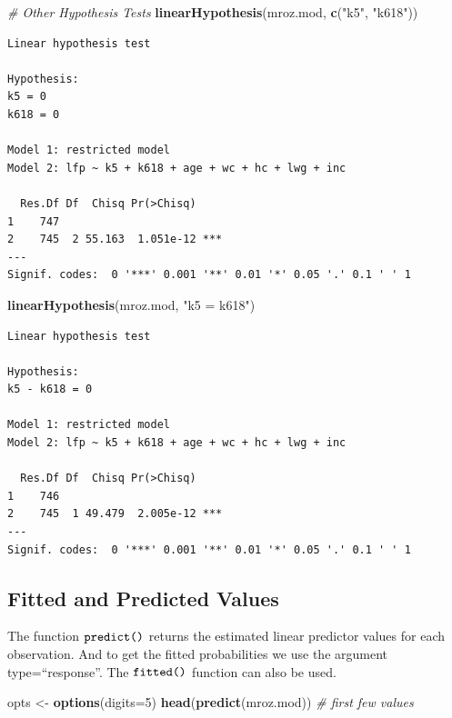 \documentclass[
]{article}
\newenvironment{Shaded}{\begin{snugshade}}{\end{snugshade}}
\newcommand{\CommentTok}[1]{\textcolor[rgb]{0.56,0.35,0.01}{\textit{#1}}}
\newcommand{\DataTypeTok}[1]{\textcolor[rgb]{0.13,0.29,0.53}{#1}}
\newcommand{\DecValTok}[1]{\textcolor[rgb]{0.00,0.00,0.81}{#1}}
\newcommand{\KeywordTok}[1]{\textcolor[rgb]{0.13,0.29,0.53}{\textbf{#1}}}
\newcommand{\NormalTok}[1]{#1}
\newcommand{\StringTok}[1]{\textcolor[rgb]{0.31,0.60,0.02}{#1}}
\begin{document}
\begin{Shaded}
\begin{Highlighting}[]
\CommentTok{# Other Hypothesis Tests}
\KeywordTok{linearHypothesis}\NormalTok{(mroz.mod, }\KeywordTok{c}\NormalTok{(}\StringTok{"k5"}\NormalTok{, }\StringTok{"k618"}\NormalTok{))}
\end{Highlighting}
\end{Shaded}

\begin{verbatim}
Linear hypothesis test

Hypothesis:
k5 = 0
k618 = 0

Model 1: restricted model
Model 2: lfp ~ k5 + k618 + age + wc + hc + lwg + inc

  Res.Df Df  Chisq Pr(>Chisq)    
1    747                         
2    745  2 55.163  1.051e-12 ***
---
Signif. codes:  0 '***' 0.001 '**' 0.01 '*' 0.05 '.' 0.1 ' ' 1
\end{verbatim}

\begin{Shaded}
\begin{Highlighting}[]
\KeywordTok{linearHypothesis}\NormalTok{(mroz.mod, }\StringTok{"k5 = k618"}\NormalTok{)}
\end{Highlighting}
\end{Shaded}

\begin{verbatim}
Linear hypothesis test

Hypothesis:
k5 - k618 = 0

Model 1: restricted model
Model 2: lfp ~ k5 + k618 + age + wc + hc + lwg + inc

  Res.Df Df  Chisq Pr(>Chisq)    
1    746                         
2    745  1 49.479  2.005e-12 ***
---
Signif. codes:  0 '***' 0.001 '**' 0.01 '*' 0.05 '.' 0.1 ' ' 1
\end{verbatim}

\hypertarget{fitted-and-predicted-values}{%
\subsection{Fitted and Predicted
Values}\label{fitted-and-predicted-values}}

The function \(\verb+predict()+\) returns the estimated linear predictor
values for each observation. And to get the fitted probabilities we use
the argument type=``response''. The \(\verb+fitted()+\) function can
also be used.

\begin{Shaded}
\begin{Highlighting}[]
\NormalTok{opts <-}\StringTok{ }\KeywordTok{options}\NormalTok{(}\DataTypeTok{digits=}\DecValTok{5}\NormalTok{)}
\KeywordTok{head}\NormalTok{(}\KeywordTok{predict}\NormalTok{(mroz.mod)) }\CommentTok{# first few values}
\end{Highlighting}
\end{Shaded}
\end{document}
